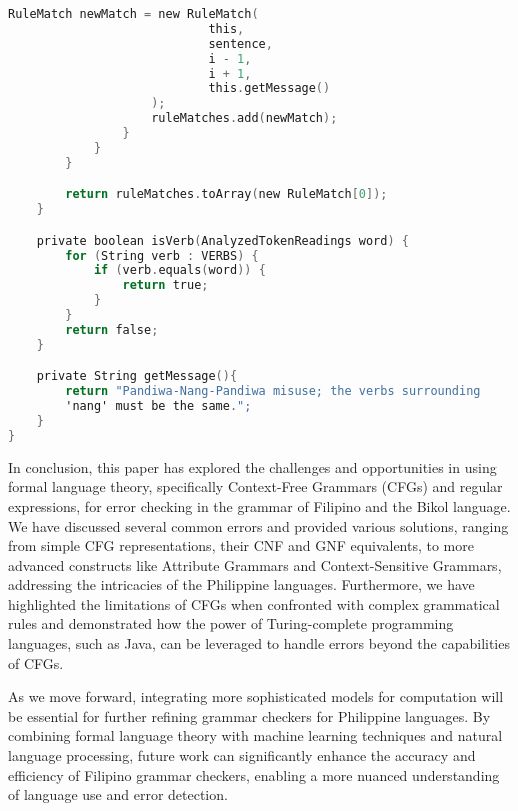 \begin{lstlisting}[language=C, caption=Implementation of Pandiwa-Nang-Pandiwa Grammar Rule in Java]
                    RuleMatch newMatch = new RuleMatch(
                            this,
                            sentence,
                            i - 1,
                            i + 1,
                            this.getMessage()
                    );
                    ruleMatches.add(newMatch);
                }
            }
        }

        return ruleMatches.toArray(new RuleMatch[0]);
    }

    private boolean isVerb(AnalyzedTokenReadings word) {
        for (String verb : VERBS) {
            if (verb.equals(word)) {
                return true;
            }
        }
        return false;
    }

    private String getMessage(){
        return "Pandiwa-Nang-Pandiwa misuse; the verbs surrounding 
        'nang' must be the same.";
    }
}
\end{lstlisting}

In conclusion, this paper has explored the challenges and opportunities in using formal language theory, specifically Context-Free Grammars (CFGs) and regular expressions, for error checking in the grammar of Filipino and the Bikol language. We have discussed several common errors and provided various solutions, ranging from simple CFG representations, their CNF and GNF equivalents, to more advanced constructs like Attribute Grammars and Context-Sensitive Grammars, addressing the intricacies of the Philippine languages. Furthermore, we have highlighted the limitations of CFGs when confronted with complex grammatical rules and demonstrated how the power of Turing-complete programming languages, such as Java, can be leveraged to handle errors beyond the capabilities of CFGs.

As we move forward, integrating more sophisticated models for computation will be essential for further refining grammar checkers for Philippine languages. By combining formal language theory with machine learning techniques and natural language processing, future work can significantly enhance the accuracy and efficiency of Filipino grammar checkers, enabling a more nuanced understanding of language use and error detection.
